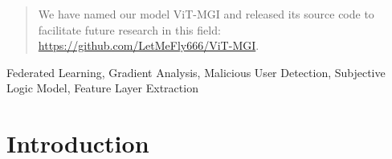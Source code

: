 \documentclass[conference]{IEEEtran}
\begin{document}
\begin{abstract}
We have named our model ViT-MGI and released its source code to facilitate future research in this field: \href{https://github.com/LetMeFly666/ViT-MGI}{https://github.com/LetMeFly666/ViT-MGI}.








\end{abstract}


\begin{IEEEkeywords}

Federated Learning, Gradient Analysis, Malicious User Detection, Subjective Logic Model, Feature Layer Extraction
\end{IEEEkeywords}

\section{Introduction}

\label{sec:intro}



\end{document}
